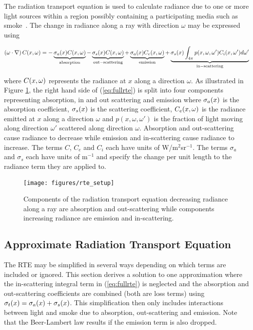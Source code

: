 The radiation transport equation is used to calculate radiance due to one or more light sources within a region possibly containing a participating media such as smoke~\cite{Siegel:2001}. The change in radiance along a ray with direction $\omega$ may be expressed using

\begin{eqnarray}
\label{eq:fullrte}
 \left(\omega\cdot\nabla\right)C(x,\omega) =
-\underbrace{\sigma_a(x)C(x,\omega)}_\mathrm{absorption}-\underbrace{\sigma_s(x)C(x,\omega)}_\mathrm{out-scattering}
+ \underbrace{\sigma_a(x)C_e(x,\omega)}_\mathrm{emission} +
\underbrace{\sigma_s(x)\int_{4\pi}p(x,\omega,\omega')C_i(x,\omega')d\omega'}_\mathrm{in-scattering}
\end{eqnarray}

\noindent where  $C(x,\omega)$ represents the  radiance at $x$ along a direction $\omega$.
As illustrated in Figure \ref{figRadiance}, the right hand side of (\ref{eq:fullrte}) is split into four components representing absorption, in and out scattering and emission where $\sigma_a(x)$ is the absorption coefficient, $\sigma_s(x)$ is the scattering coefficient, $C_e(x,\omega)$ is the radiance emitted at $x$ along a direction $\omega$ and $p(x,\omega,\omega')$ is the fraction of light moving along direction $\omega'$ scattered along direction $\omega$. Absorption and out-scattering cause radiance to decrease while emission and in-scattering cause radiance to increase. The terms $C$, $C_e$ and $C_i$ each have units of W/m$^2$sr$^{-1}$.  The terms $\sigma_a$ and $\sigma_s$ each have units of m$^{-1}$ and specify the change per unit length to the radiance term they are applied to.

\begin{figure}[\figoptions]
\begin{center}
\texttt{[image: figures/rte\_setup]}
\end{center}
\caption{Components of the radiation transport equation decreasing radiance along a ray are
absorption and out-scattering while components increasing radiance are emission and in-scattering.}
\label{figRadiance}
\end{figure}

%
%

\subsection{Approximate Radiation Transport Equation}

The RTE may be simplified in several ways depending on which terms are included or ignored.  This section derives a solution to one approximation where the in-scattering integral term in (\ref{eq:fullrte}) is neglected and the absorption and out-scattering coefficients are combined (both are loss terms) using $\sigma_t(x)=\sigma_a(x)+\sigma_s(x)$.  This simplification then only includes interactions between light and smoke due to absorption,  out-scattering and emission.  Note that the Beer-Lambert law results if the emission term is also dropped.

